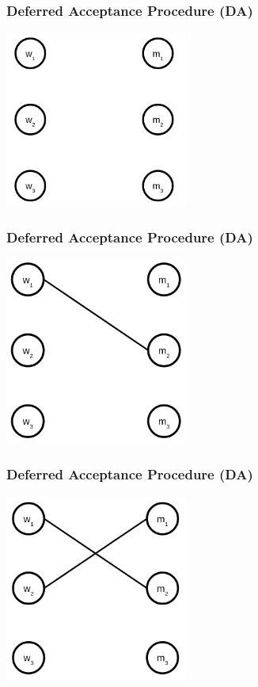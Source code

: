 \begin{frame} 
\frametitle{Deferred Acceptance Procedure (DA)}
\centering
\includegraphics[width=6cm]{img/matching/twosided.png}
\end{frame}

\begin{frame} 
\frametitle{Deferred Acceptance Procedure (DA)}
\centering
\includegraphics[width=6cm]{img/matching/da1.png}
\end{frame}

\begin{frame} 
\frametitle{Deferred Acceptance Procedure (DA)}
\centering
\includegraphics[width=6cm]{img/matching/da2.png}
\end{frame}

